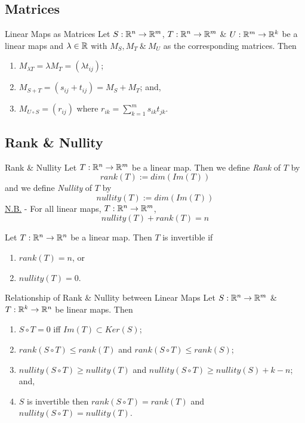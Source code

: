 \documentclass[11pt,a4paper]{article}
\begin{document}
\subsection{Matrices}

\subtitle{Definition 5.09 - }{Linear Maps as Matrices}
Let $S : \mathbb{R}^n \to \mathbb{R}^m$, $T : \mathbb{R}^n \to \mathbb{R}^m$ \& $U : \mathbb{R}^m \to \mathbb{R}^k$ be a linear maps and $\lambda \in \mathbb{R}$ with $M_S, M_T\ \&\ M_U$ as the corresponding matrices. Then
\begin{enumerate}[label=\roman*)]
  \item $M_{\lambda T} = \lambda M_T = (\lambda t_{ij})$;
  \item $M_{S + T} = (s_{ij} + t_{ij}) = M_S + M_T$; and,
  \item $M_{U \circ S} = (r_{ij})$ where $r_{ik} = \sum_{k=1}^m s_{ik}t_{jk}$.
\end{enumerate}

\subsection{Rank \& Nullity}

\subtitle{Defintion 5.10 - }{Rank \& Nullity}
Let $T : \mathbb{R}^n \to \mathbb{R}^m$ be a linear map. Then we define \textit{Rank} of $T$ by $$rank(T) := dim(Im(T))$$
and we define \textit{Nullity} of $T$ by $$nullity(T) := dim(Im(T))$$
\underline{N.B.} - For all linear maps, $T : \mathbb{R}^n \to \mathbb{R}^m$, $$nullity(T) + rank(T) = n$$

\subtitle{Remark 5.11}{}
Let $T : \mathbb{R}^n \to \mathbb{R}^n$ be a linear map. Then $T$ is invertible if
\begin{enumerate}[label=\roman*)]
  \item $rank(T) = n$, or
  \item $nullity(T) = 0$.
\end{enumerate}

\subtitle{Theorem 5.12 - }{Relationship of Rank \& Nullity between Linear Maps}
Let $S : \mathbb{R}^n \to \mathbb{R}^m$ \& $T : \mathbb{R}^k \to \mathbb{R}^n$ be linear maps. Then
\begin{enumerate}[label=\roman*)]
  \item $S \circ T = 0$ iff $Im(T) \subset Ker(S)$;
  \item $rank(S \circ T) \leq rank(T)$ and $rank(S \circ T) \leq rank(S)$;
  \item $nullity(S \circ T) \geq nullity(T)$ and $nullity(S \circ T) \geq nullity(S) + k - n$; and,
  \item $S$ is invertible then $rank(S \circ T) = rank(T)$ and $nullity(S \circ T) = nullity(T)$.
\end{enumerate}
\end{document}
